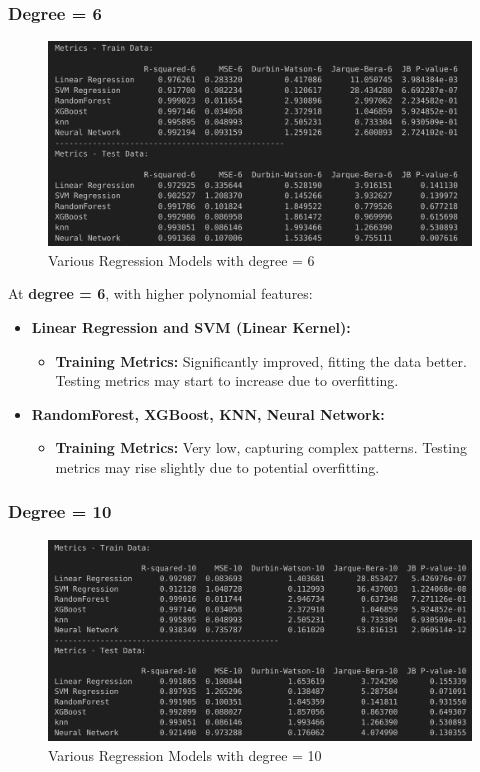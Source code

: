 \subsubsection*{Degree = 6}

\begin{figure}[H]
    \centering
    \includegraphics[width=0.8\linewidth]{./Images/Error-Metrics-Degree-6.png}
    \caption{Various Regression Models with degree = 6}
\end{figure}

At \textbf{degree = 6}, with higher polynomial features:

\begin{itemize}
    \item \textbf{Linear Regression and SVM (Linear Kernel):} 
    \begin{itemize}
        \item \textbf{Training Metrics:} Significantly improved, fitting the data better. Testing metrics may start to increase due to overfitting.
    \end{itemize}
    
    \item \textbf{RandomForest, XGBoost, KNN, Neural Network:}
    \begin{itemize}
        \item \textbf{Training Metrics:} Very low, capturing complex patterns. Testing metrics may rise slightly due to potential overfitting.
    \end{itemize}
\end{itemize}

\subsubsection*{Degree = 10}

\begin{figure}[H]
    \centering
    \includegraphics[width=0.8\linewidth]{./Images/Error-Metrics-Degree-10.png}
    \caption{Various Regression Models with degree = 10}
\end{figure}

